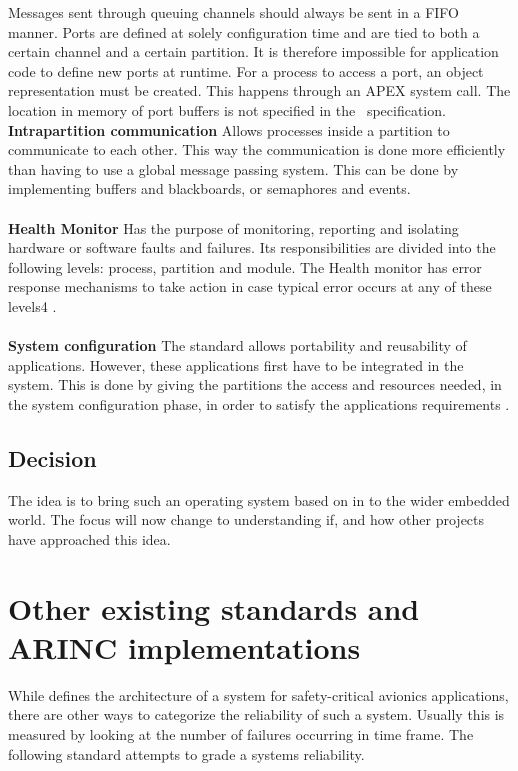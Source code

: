 Messages sent through queuing channels should always be sent in a FIFO manner.
Ports are defined at solely configuration time and are tied to both a certain channel and a certain partition.
It is therefore impossible for application code to define new ports at runtime. 
For a process to access a port, an object representation must be created. This happens through an APEX system call.
The location in memory of port buffers is not specified in the \arinc\ specification.
\fi
\textbf{Intrapartition communication}
Allows processes inside a partition to communicate to each other. This way
the communication is done more efficiently than having to use a
global message passing system.
This can be done by implementing buffers and blackboards, or semaphores and
events\cite{arinc_page_36}.
\\\\
\textbf{Health Monitor}
Has the purpose of monitoring, reporting and isolating hardware or
software faults and failures. Its responsibilities are divided into
the following levels: process, partition and module. The Health monitor has
error response mechanisms to take action in case typical
error occurs at any of these levels4
\cite{arinc_page_40}.
\\\\
\textbf{System configuration}
The standard allows portability and reusability of applications. However,
these applications first have to be integrated in the system. This is done
by giving the partitions the access and resources needed,
in the system configuration phase, in order to
satisfy the applications\textquotesingle{} requirements \cite{arinc_page_42}.

\subsection{Decision}
The idea is to bring such an operating system based on \arinc{}
in to the wider embedded world.
The focus will now change to understanding if, and how other projects
have approached this idea.

\section{Other existing standards and ARINC implementations}
While \arinc{} defines the architecture of a system for safety-critical
avionics applications, there are other ways to categorize the reliability of such a system.
Usually this is measured by looking at the number
of failures occurring in time frame.
The following standard attempts to grade a systems reliability.

